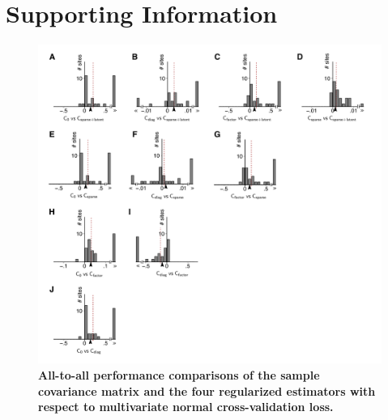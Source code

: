 \documentclass[10pt]{article}
\begin{document}
\newpage
\section*{Supporting Information}
\setcounter{figure}{0}
\renewcommand{\figurename}{Figure S}


\begin{figure}[!ht]
\begin{center}
\includegraphics{./figures/Figure-Supp01.pdf}
\end{center}
\caption{{\bf All-to-all performance comparisons of the sample covariance matrix and the four regularized estimators with respect to multivariate normal cross-validation loss.}
}
\label{supp:01}
\end{figure}
\end{document}
